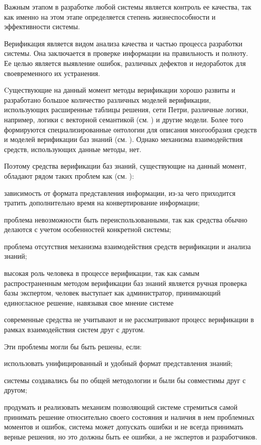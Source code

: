 Важным этапом в разработке любой системы является контроль ее качества, так как именно на этом этапе определяется степень жизнеспособности и эффективности системы.

Верификация является видом анализа качества и частью процесса разработки системы. Она заключается в проверке информации на правильность и полноту.
Ее целью является выявление ошибок, различных дефектов и недоработок для своевременного их устранения.

Cуществующие на данный момент методы верификации хорошо развиты и разработано большое количество различных моделей верификации, использующих расширенные таблицы решения, сети Петри, различные логики, например, логики с векторной семантикой (см. ) и другие модели. Более того формируются специализированные онтологии для описания многообразия средств и моделей верификации баз знаний (см. ). Однако механизма взаимодействия средств, использующих данные методы, нет.

Поэтому средства верификации баз знаний, существующие на данный момент, обладают рядом таких проблем как (см. ):
\begin{textitemize}
    \item зависимость от формата представления информации, из-за чего приходится тратить дополнительно время на конвертирование информации;
    \item проблема невозможности быть переиспользованными, так как средства обычно делаются с учетом особенностей конкретной системы;
    \item проблема отсутствия механизма взаимодействия средств верификации и анализа знаний;
    \item высокая роль человека в процессе верификации, так как самым распространенным методом верификации баз знаний является ручная проверка базы экспертом, человек выступает как администратор, принимающий единогласное решение, навязывая свое мнение системе
    \item современные средства не учитывают и не рассматривают процесс верификации в рамках взаимодействия систем друг с другом.
\end{textitemize}

Эти проблемы могли бы быть решены, если:
\begin{textitemize}
    \item использовать унифицированный и удобный формат представления знаний;
    \item системы создавались бы по общей методологии и были бы совместимы друг с другом;
    \item продумать и реализовать механизм позволяющий системе стремиться самой принимать решение относительно своего состояния и наличия в нем проблемных моментов и ошибок, система может допускать ошибки и не всегда принимать верные решения, но это должны быть ее ошибки, а не экспертов и разработчиков.
\end{textitemize}

